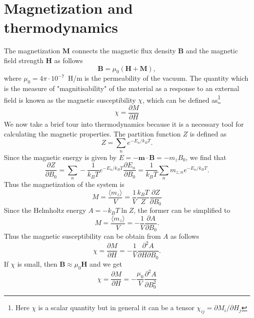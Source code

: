 \section{Magnetization and thermodynamics}
The magnetization $\mathbf{M}$ connects the magnetic flux density $\mathbf{B}$ and the magnetic field strength $\mathbf{H}$ as follows
\begin{equation}
\mathbf{B}= \mu_0(\mathbf{H}+\mathbf{M}),
\end{equation}
where $\mu_0 = 4\pi \cdot 10^{-7}$~H/m is the permeability of the vacuum. The quantity which is the measure of "magnitisability" of the material as a response to an external field is known as the magnetic susceptibility $\chi$, which can be defined as\footnote{Here $\chi$ is a scalar quantity but in general it can be a tensor $\chi_{ij} = \partial M_i/\partial H_j$}
\begin{equation}
\chi = \frac{\partial M}{\partial H}
\end{equation}
We now take a brief tour into thermodynamics because it is a necessary tool for calculating the magnetic properties. The partition function $Z$ is defined as
\begin{equation}
Z =  \sum_{n} e^{-E_n/k_B T}.
\end{equation} 
Since the magnetic energy is given by $E=-\mathbf{m}\cdot\mathbf{B}=-m_zB_0$, we find that
\begin{equation}
\frac{\partial Z}{\partial B_0} = \sum_{n} -\frac{1}{k_B T} e^{-E_n/k_B T} \frac{\partial E_n}{\partial B_0} =  \frac{1}{k_B T} \sum_{n} m_{z,n} e^{-E_n/k_B T}.
\end{equation}
Thus the magnetization of the system is
\begin{equation}
M = \frac{\langle m_z\rangle}{V} = \frac{1}{V}\frac{k_B T}{Z} \frac{\partial Z}{\partial B_0}
\end{equation}
Since the Helmholtz energy $A = - k_B T \ln Z$, the former can be simplified
to
\begin{equation}
M = \frac{\langle m_z\rangle}{V} = - \frac{1}{V} \frac{\partial A}{\partial B_0}.
\end{equation}
Thus the magnetic susceptibility can be obtain from $A$ as follows
\begin{equation}
\chi = \frac{\partial M}{\partial H} =  - \frac{1}{V} \frac{\partial^2 A}{\partial H \partial B_0}.
\end{equation}
If $\chi$ is small, then $\mathbf{B} \approx \mu_0 \mathbf{H}$ and we get
\begin{equation}
\chi = \frac{\partial M}{\partial H} =  - \frac{\mu_0}{V} \frac{\partial^2 A}{\partial B_0^2}
\end{equation}

